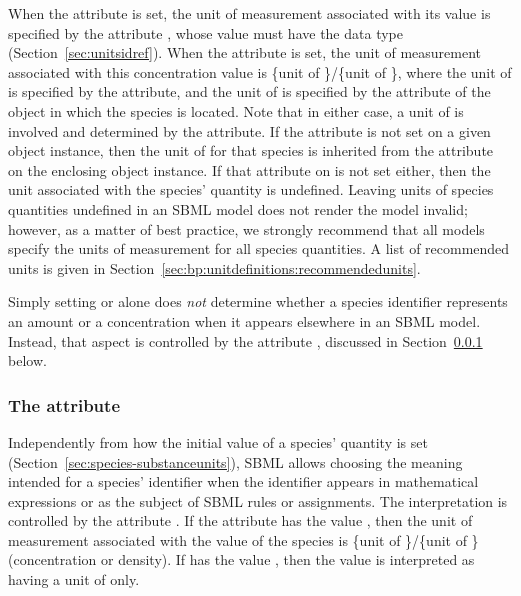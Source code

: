 When the attribute  is set, the unit of
measurement associated with its value is specified by the \Species
attribute , whose value must have the data
type  (Section~\ref{sec:unitsidref}).  When
the  attribute is set, the unit of
measurement associated with this concentration value is \{unit of
\}/\{unit of \}, where the unit
of  is specified by the \Species
{} attribute, and the unit of
 is specified by the  attribute of
the \Compartment object in which the species is located.  Note
that in either case, a unit of  is involved and
determined by the  attribute.  If the
 attribute is not set on a given \Species
object instance, then the unit of  for that
species is inherited from the  attribute on
the enclosing \Model object instance.  If that attribute on \Model
is not set either, then the unit associated with the species'
quantity is undefined.  Leaving units of species quantities
undefined in an SBML model does not render the model invalid;
however, as a matter of best practice, we strongly recommend that
all models specify the units of measurement for all species
quantities.  A list of recommended units is given in
Section~\ref{sec:bp:unitdefinitions:recommendedunits}.

Simply setting  or
 alone does \emph{not} determine
whether a species identifier represents an amount or a
concentration when it appears elsewhere in an SBML model.
Instead, that aspect is controlled by the attribute
, discussed in
Section~\ref{sec:species-units} below.


\subsubsection{The  attribute}
\label{sec:species-units}

Independently from how the initial value of a species' quantity is
set (Section~\ref{sec:species-substanceunits}), SBML allows
choosing the meaning intended for a species' identifier when the
identifier appears in mathematical expressions or as the subject
of SBML rules or assignments.  The interpretation is controlled by
the attribute .  If the attribute has
the value , then the unit of measurement associated
with the value of the species is \{unit of
\}/\{unit of \} (\ie concentration
or density).  If  has the value
, then the value is interpreted as having a unit of
 only.

